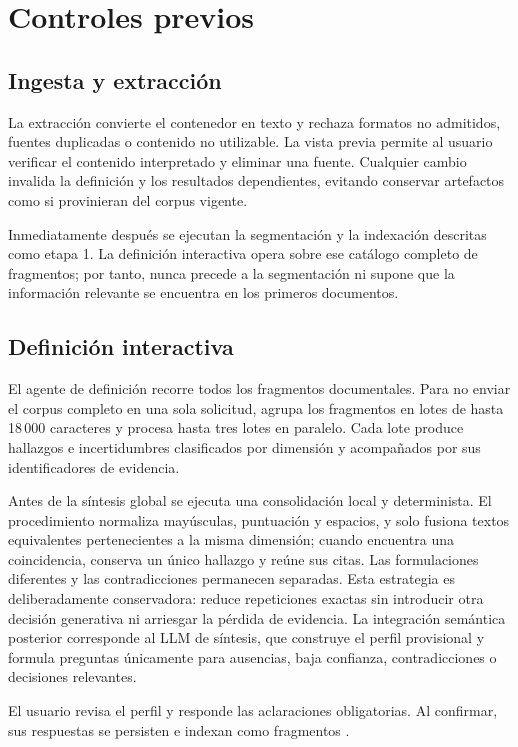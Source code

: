 \section{Controles previos}

\subsection{Ingesta y extracción}

La extracción convierte el contenedor en texto y rechaza formatos no admitidos, fuentes duplicadas o contenido no utilizable. La vista previa permite al usuario verificar el contenido interpretado y eliminar una fuente. Cualquier cambio invalida la definición y los resultados dependientes, evitando conservar artefactos como si provinieran del corpus vigente.

Inmediatamente después se ejecutan la segmentación y la indexación descritas como etapa 1. La definición interactiva opera sobre ese catálogo completo de fragmentos; por tanto, nunca precede a la segmentación ni supone que la información relevante se encuentra en los primeros documentos.

\subsection{Definición interactiva}

El agente de definición recorre todos los fragmentos documentales. Para no enviar el corpus completo en una sola solicitud, agrupa los fragmentos en lotes de hasta 18\,000 caracteres y procesa hasta tres lotes en paralelo. Cada lote produce hallazgos e incertidumbres clasificados por dimensión y acompañados por sus identificadores de evidencia.

Antes de la síntesis global se ejecuta una consolidación local y determinista. El procedimiento normaliza mayúsculas, puntuación y espacios, y solo fusiona textos equivalentes pertenecientes a la misma dimensión; cuando encuentra una coincidencia, conserva un único hallazgo y reúne sus citas. Las formulaciones diferentes y las contradicciones permanecen separadas. Esta estrategia es deliberadamente conservadora: reduce repeticiones exactas sin introducir otra decisión generativa ni arriesgar la pérdida de evidencia. La integración semántica posterior corresponde al LLM de síntesis, que construye el perfil provisional y formula preguntas únicamente para ausencias, baja confianza, contradicciones o decisiones relevantes.

El usuario revisa el perfil y responde las aclaraciones obligatorias. Al confirmar, sus respuestas se persisten e indexan como fragmentos .

